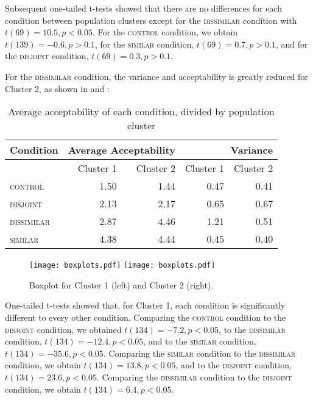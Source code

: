 Subsequent one-tailed t-tests showed that there are no differences for each condition between population clusters except for the {\scshape dissimilar} condition with $t(69)=10.5, p<0.05$. For the {\scshape control} condition, we obtain $t(139)=-0.6, p>0.1$, for the {\scshape similar} condition, $t(69)=0.7, p>0.1$, and for the {\scshape disjoint} condition, $t(69)=0.3, p>0.1$.

For the {\scshape dissimilar} condition, the variance and acceptability is greatly reduced for Cluster 2, as shown in  and :
\begin{table}[!htb]
    \caption{Average acceptability of each condition, divided by population cluster}
    \begin{tabular}{lrrrr}
    \toprule
        Condition & \multicolumn{2}{r}{Average Acceptability} & \multicolumn{2}{r}{Variance}\\\midrule
                        & Cluster 1       & Cluster 2       & Cluster 1 & Cluster 2\\\cmidrule[0.1pt](lr{0.1em}){2-3}\cmidrule[0.1pt](lr{0.1em}){4-5}
        {\scshape control}    & 1.50  & 1.44&   0.47      &  0.41\\
        {\scshape disjoint}   & 2.13  & 2.17 &   0.65     &  0.67\\
        {\scshape dissimilar} & 2.87  & 4.46 &   1.21     &  0.51\\
        {\scshape similar}    & 4.38  &   4.44  & 0.45  &  0.40\\
        \bottomrule
    \end{tabular}
\end{table}
\begin{figure}[!htb]
\begin{minipage}{\linewidth}
\texttt{[image: boxplots.pdf]}\hfill
\texttt{[image: boxplots.pdf]}
\end{minipage}
\caption{Boxplot for Cluster 1 (left) and Cluster 2 (right).}
\end{figure}

One-tailed t-tests showed that, for Cluster 1, each condition is significantly different to every other condition. Comparing the {\scshape control} condition to the {\scshape disjoint} condition, we obtained $t(134)=-7.2, p<0.05$, to the {\scshape dissimilar} condition, $t(134)=-12.4, p<0.05$, and to the {\scshape similar} condition, $t(134)=-35.6, p<0.05$. Comparing the {\scshape similar} condition to the {\scshape dissimilar} condition, we obtain $t(134)=13.8, p<0.05$, and to the {\scshape disjoint} condition, $t(134)=23.6, p<0.05$. Comparing the {\scshape dissimilar} condition to the {\scshape disjoint} condition, we obtain $t(134)=6.4, p<0.05$.

